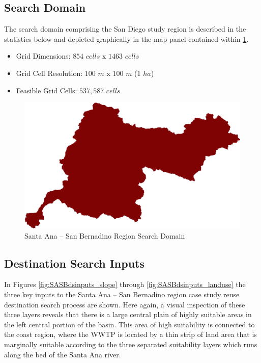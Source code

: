     \subsection{Search Domain}

    The search domain comprising the San Diego study region is described in the statistics below and depicted graphically in the map panel contained within \ref{fig:SASBdomain}.
    
    \begin{itemize}
      \setlength{\itemsep}{0cm}
      \setlength{\parskip}{0cm}
        \item Grid Dimensions: $854$ $cells$ x $1463$ $cells$
        \item Grid Cell Resolution: $100$ $m$ x $100$ $m$ ($1$ $ha$)
        \item Feasible Grid Cells: $537,587$ $cells$
    \end{itemize}
    
        \begin{figure}[!h]
            \begin{center}
            \includegraphics[width=5.5in]{figures/SanBernadino_SearchDomain.png}   
            \caption{Santa Ana -- San Bernadino Region Search Domain}
            \label{fig:SASBdomain}
            \end{center}
        \end{figure}
        
\subsection{Destination Search Inputs}

In Figures \ref{fig:SASBdsinputs_slope} through \ref{fig:SASBdsinputs_landuse} the three key inputs to the Santa Ana -- San Bernadino region case study reuse destination search process are shown. Here again, a visual inspection of these three layers reveals that there is a large central plain of highly suitable areas in the left central portion of the basin. This area of high suitability is connected to the coast region, where the WWTP is located by a thin strip of land area that is marginally suitable according to the three separated suitability layers which runs along the bed of the Santa Ana river. 
    
